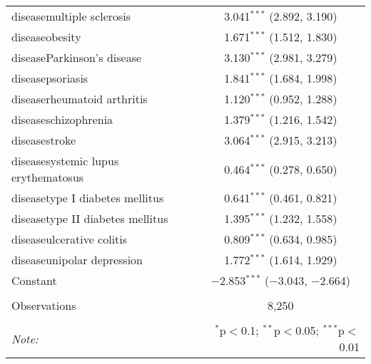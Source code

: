 \begin{table}[!htbp]
\begin{tabular}{@{\extracolsep{5pt}}lc}
  diseasemultiple sclerosis & 3.041$^{***}$ (2.892, 3.190) \\ 
  diseaseobesity & 1.671$^{***}$ (1.512, 1.830) \\ 
  diseaseParkinson's disease & 3.130$^{***}$ (2.981, 3.279) \\ 
  diseasepsoriasis & 1.841$^{***}$ (1.684, 1.998) \\ 
  diseaserheumatoid arthritis & 1.120$^{***}$ (0.952, 1.288) \\ 
  diseaseschizophrenia & 1.379$^{***}$ (1.216, 1.542) \\ 
  diseasestroke & 3.064$^{***}$ (2.915, 3.213) \\ 
  diseasesystemic lupus erythematosus & 0.464$^{***}$ (0.278, 0.650) \\ 
  diseasetype I diabetes mellitus & 0.641$^{***}$ (0.461, 0.821) \\ 
  diseasetype II diabetes mellitus & 1.395$^{***}$ (1.232, 1.558) \\ 
  diseaseulcerative colitis & 0.809$^{***}$ (0.634, 0.985) \\ 
  diseaseunipolar depression & 1.772$^{***}$ (1.614, 1.929) \\ 
  Constant & $-$2.853$^{***}$ ($-$3.043, $-$2.664) \\ 
 \hline \\[-1.8ex] 
Observations & 8,250 \\ 
\hline 
\hline \\[-1.8ex] 
\textit{Note:}  & \multicolumn{1}{r}{$^{*}$p$<$0.1; $^{**}$p$<$0.05; $^{***}$p$<$0.01} \\ 
\end{tabular} 
\end{table} 

